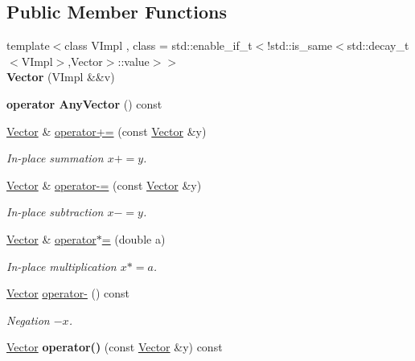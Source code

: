\subsection*{Public Member Functions}
\begin{DoxyCompactItemize}
\item 
\hypertarget{classSpacy_1_1Vector_a593ac1d34348d747e2c147142a08a518}{}{\footnotesize template$<$class V\+Impl , class  = std\+::enable\+\_\+if\+\_\+t$<$!std\+::is\+\_\+same$<$std\+::decay\+\_\+t$<$\+V\+Impl$>$,\+Vector$>$\+::value$>$$>$ }\\{\bfseries Vector} (V\+Impl \&\&v)\label{classSpacy_1_1Vector_a593ac1d34348d747e2c147142a08a518}

\item 
\hypertarget{classSpacy_1_1Vector_a48f933bde3b851d3134f06e3a2ef4d0f}{}{\bfseries operator Any\+Vector} () const \label{classSpacy_1_1Vector_a48f933bde3b851d3134f06e3a2ef4d0f}

\item 
\hyperlink{classSpacy_1_1Vector}{Vector} \& \hyperlink{classSpacy_1_1Vector_a6d5770a3bd58db532e79b16f2526c275_a6d5770a3bd58db532e79b16f2526c275}{operator+=} (const \hyperlink{classSpacy_1_1Vector}{Vector} \&y)
\begin{DoxyCompactList}\small\item\em In-\/place summation $ x+=y$. \end{DoxyCompactList}\item 
\hyperlink{classSpacy_1_1Vector}{Vector} \& \hyperlink{classSpacy_1_1Vector_afbebc56400ed2e281815fee88b78b3f6_afbebc56400ed2e281815fee88b78b3f6}{operator-\/=} (const \hyperlink{classSpacy_1_1Vector}{Vector} \&y)
\begin{DoxyCompactList}\small\item\em In-\/place subtraction $ x-=y$. \end{DoxyCompactList}\item 
\hyperlink{classSpacy_1_1Vector}{Vector} \& \hyperlink{classSpacy_1_1Vector_a06a3538f752f001b289c2f690357e1e7_a06a3538f752f001b289c2f690357e1e7}{operator$\ast$=} (double a)
\begin{DoxyCompactList}\small\item\em In-\/place multiplication $ x*=a$. \end{DoxyCompactList}\item 
\hyperlink{classSpacy_1_1Vector}{Vector} \hyperlink{classSpacy_1_1Vector_a050dba43b304fdf5f15141d25465be56_a050dba43b304fdf5f15141d25465be56}{operator-\/} () const 
\begin{DoxyCompactList}\small\item\em Negation $ -x$. \end{DoxyCompactList}\item 
\hypertarget{classSpacy_1_1Vector_ad14609b2ab0255107924b19f803b0896}{}\hyperlink{classSpacy_1_1Vector}{Vector} {\bfseries operator()} (const \hyperlink{classSpacy_1_1Vector}{Vector} \&y) const \label{classSpacy_1_1Vector_ad14609b2ab0255107924b19f803b0896}


\end{DoxyCompactItemize}
